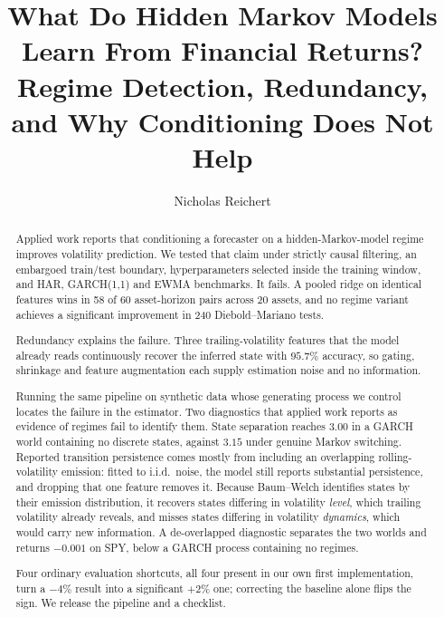 \documentclass[sigconf,nonacm]{acmart}
\begin{document}
\title{What Do Hidden Markov Models Learn From Financial Returns?\\
Regime Detection, Redundancy, and Why Conditioning Does Not Help}

\author{Nicholas Reichert}

\begin{abstract}
Applied work reports that conditioning a forecaster on a hidden-Markov-model
regime improves volatility prediction. We tested that claim under strictly
causal filtering, an embargoed train/test boundary, hyperparameters selected
inside the training window, and HAR, GARCH(1,1) and EWMA benchmarks. It fails. A
pooled ridge on identical features wins in 58 of 60 asset-horizon pairs across 20
assets, and no regime variant achieves a significant improvement in 240
Diebold--Mariano tests.

Redundancy explains the failure. Three trailing-volatility features that the
model already reads continuously recover the inferred state with $95.7\%$
accuracy, so gating, shrinkage and feature augmentation each supply estimation
noise and no information.

Running the same pipeline on synthetic data whose generating process we control
locates the failure in the estimator. Two diagnostics that applied work reports
as evidence of regimes fail to identify them. State separation reaches $3.00$ in
a GARCH world containing no discrete states, against $3.15$ under genuine Markov
switching. Reported transition persistence comes mostly from including an
overlapping rolling-volatility emission: fitted to i.i.d.\ noise, the model still
reports substantial persistence, and dropping that one feature removes it.
Because Baum--Welch identifies states by their emission distribution, it recovers
states differing in volatility \emph{level}, which trailing volatility already
reveals, and misses states differing in volatility \emph{dynamics}, which would
carry new information. A de-overlapped diagnostic separates the two worlds and
returns $-0.001$ on SPY, below a GARCH process containing no regimes.

Four ordinary evaluation shortcuts, all four present in our own first
implementation, turn a $-4\%$ result into a significant $+2\%$ one; correcting
the baseline alone flips the sign. We release the pipeline and a checklist.
\end{abstract}
\end{document}
